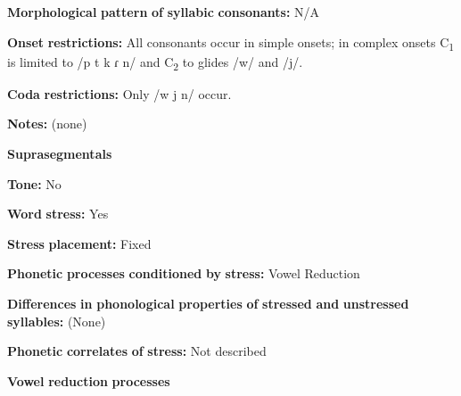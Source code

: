 \begin{styleBody}
\textbf{Morphological} \textbf{pattern} \textbf{of} \textbf{syllabic} \textbf{consonants:} N/A
\end{styleBody}

\begin{styleBody}
\textbf{Onset} \textbf{restrictions:} All consonants occur in simple onsets; in complex onsets C\textsubscript{1} is limited to /p t k ɾ n/ and C\textsubscript{2} to glides /w/ and /j/.
\end{styleBody}

\begin{styleBody}
\textbf{Coda} \textbf{restrictions:} Only /w j n/ occur.
\end{styleBody}

\begin{styleBody}
\textbf{Notes:} (none)
\end{styleBody}

\begin{styleBody}
\textbf{Suprasegmentals}
\end{styleBody}

\begin{styleBody}
\textbf{Tone:} No
\end{styleBody}

\begin{styleBody}
\textbf{Word} \textbf{stress:} Yes
\end{styleBody}

\begin{styleBody}
\textbf{Stress} \textbf{placement:} Fixed
\end{styleBody}

\begin{styleBody}
\textbf{Phonetic} \textbf{processes} \textbf{conditioned} \textbf{by} \textbf{stress:} Vowel Reduction
\end{styleBody}

\begin{styleBody}
\textbf{Differences} \textbf{in} \textbf{phonological} \textbf{properties} \textbf{of} \textbf{stressed} \textbf{and} \textbf{unstressed} \textbf{syllables:} (None)
\end{styleBody}

\begin{styleBody}
\textbf{Phonetic} \textbf{correlates} \textbf{of} \textbf{stress:} Not described
\end{styleBody}

\begin{styleBody}
\textbf{Vowel} \textbf{reduction} \textbf{processes}
\end{styleBody}

